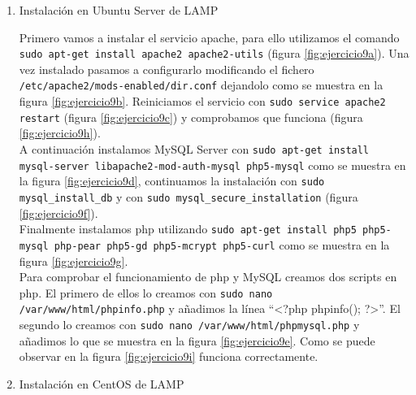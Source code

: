 \begin{enumerate}
	\item Instalación en Ubuntu Server de LAMP
	
Primero vamos a instalar el servicio apache, para ello utilizamos el comando \texttt{sudo apt-get install apache2 apache2-utils} (figura \ref{fig:ejercicio9a}). Una vez instalado pasamos a configurarlo modificando el fichero \texttt{/etc/apache2/mods-enabled/dir.conf} dejandolo como se muestra en la figura \ref{fig:ejercicio9b}. Reiniciamos el servicio con \texttt{sudo service apache2 restart} (figura \ref{fig:ejercicio9c}) y comprobamos que funciona (figura \ref{fig:ejercicio9h}).\\
A continuación instalamos MySQL Server con \texttt{sudo apt-get install mysql-server libapache2-mod-auth-mysql php5-mysql} como se muestra en la figura \ref{fig:ejercicio9d}, continuamos la instalación con \texttt{sudo mysql\_install\_db} y con \texttt{sudo mysql\_secure\_installation} (figura \ref{fig:ejercicio9f}).\\
Finalmente instalamos php utilizando \texttt{sudo apt-get install php5 php5-mysql php-pear php5-gd  php5-mcrypt php5-curl} como se muestra en la figura \ref{fig:ejercicio9g}.\\
Para comprobar el funcionamiento de php y MySQL creamos dos scripts en php. El primero de ellos lo creamos con \texttt{sudo nano /var/www/html/phpinfo.php} y añadimos la línea ``<?php phpinfo(); ?>''. El segundo lo creamos con \texttt{sudo nano /var/www/html/phpmysql.php} y añadimos lo que se muestra en la figura \ref{fig:ejercicio9e}. Como se puede observar en la figura \ref{fig:ejercicio9i} funciona correctamente.

	
	\item Instalación en CentOS de LAMP
	

\end{enumerate}
